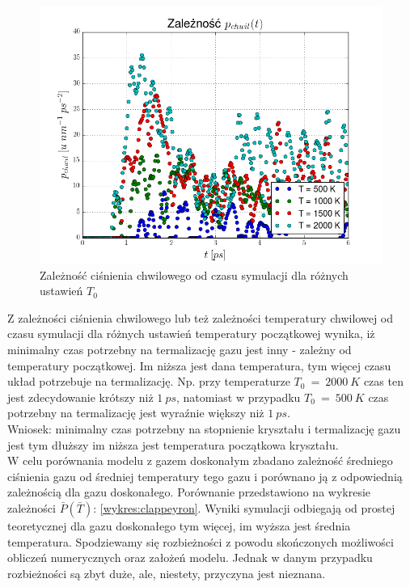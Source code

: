\documentclass[10]{article}
\begin{document}
\begin{figure}[H]
\begin{center}
\includegraphics[scale=0.6]{chwiloweP.png}
\caption{Zależność ciśnienia chwilowego od czasu symulacji dla różnych ustawień $T_0$} \label{wykres:pchwilAll}\end{center}
\end{figure}

Z zależności ciśnienia chwilowego lub też zależności temperatury chwilowej od czasu symulacji dla różnych ustawień temperatury początkowej wynika, iż minimalny czas potrzebny na termalizację gazu jest inny - zależny od temperatury początkowej. Im niższa jest dana temperatura, tym więcej czasu układ potrzebuje na termalizację. Np. przy temperaturze $T_0~=~2000~K$ czas ten jest zdecydowanie krótszy niż $1~ps$, natomiast w przypadku $T_0~=~500~K$ czas potrzebny na termalizację jest wyraźnie większy niż $1~ps$.\\
Wniosek: minimalny czas potrzebny na stopnienie kryształu i termalizację gazu jest tym dłuższy im niższa jest temperatura początkowa kryształu.
\\
W celu porównania modelu z gazem doskonałym zbadano zależność średniego ciśnienia gazu od średniej temperatury tego gazu i porównano ją z odpowiednią zależnością dla gazu doskonałego. Porównanie przedstawiono na wykresie zależności $\bar{P}(\bar{T})$: \ref{wykres:clappeyron}.
Wyniki symulacji odbiegają od prostej teoretycznej dla gazu doskonałego tym więcej, im wyższa jest średnia temperatura. Spodziewamy się rozbieżności z powodu skończonych możliwości obliczeń numerycznych oraz założeń modelu. Jednak w danym przypadku rozbieżności są zbyt duże, ale, niestety, przyczyna jest nieznana. 
\end{document}
